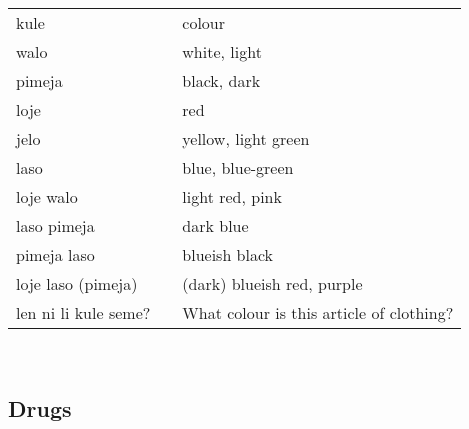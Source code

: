 \begin{supertabular}{p{4,5cm}|ll}
    kule                 &  & colour                                   \\
    walo                 &  & white, light                             \\
    pimeja               &  & black, dark                              \\
    loje                 &  & red                                      \\
    jelo                 &  & yellow, light green                      \\
    laso                 &  & blue, blue-green                         \\
    loje walo            &  & light red, pink                          \\
    laso pimeja          &  & dark blue                                \\
    pimeja laso          &  & blueish black                            \\
    loje laso (pimeja)   &  & (dark) blueish red, purple               \\
    len ni li kule seme? &  & What colour is this article of clothing? \\
\end{supertabular} \\

\subsection{Drugs}

